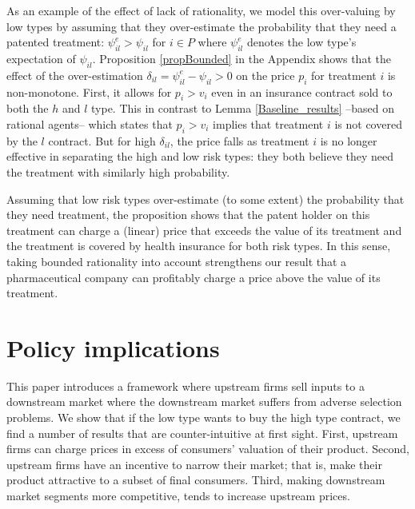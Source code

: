 \documentclass[a4paper,12pt]{article}
\begin{document}
As an example of the effect of lack of rationality, we model this over-valuing by low types by assuming that they over-estimate the probability that they need a patented treatment: \(\psi_{il}^e > \psi_{il}\) for \(i \in P\) where \(\psi_{il}^e\) denotes the low type's expectation of \(\psi_{il}\). Proposition \ref{propBounded} in the Appendix shows that the effect of the over-estimation \(\delta_{il} = \psi_{il}^e-\psi_{il}>0\) on the price \(p_i\) for treatment \(i\) is non-monotone. First, it allows for \(p_i>v_i\) even in an insurance contract sold to both the \(h\) and \(l\) type. This in contrast to Lemma \ref{Baseline_results} --based on rational agents-- which states that \(p_{i}>v_{i}\) implies that treatment \(i\) is not covered by the \(l\) contract. But for high \(\delta_{il}\), the price falls as treatment \(i\) is no longer effective in separating the high and low risk types: they both believe they need the treatment with similarly high probability.

Assuming that low risk types over-estimate (to some extent) the probability that they need treatment, the proposition shows that the patent holder on this treatment can charge a (linear) price that exceeds the value of its treatment and the treatment is covered by health insurance for both risk types. In this sense, taking bounded rationality into account strengthens our result that a pharmaceutical company can profitably charge a price above the value of its treatment.

\section{Policy implications}
\label{sec:org0f2d968}

This paper introduces a framework where upstream firms sell inputs to a downstream market where the downstream market suffers from adverse selection problems. We show that if the low type wants to buy the high type contract, we find a number of results that are counter-intuitive at first sight. First, upstream firms can charge prices in excess of consumers' valuation of their product. Second, upstream firms have an incentive to narrow their market; that is, make their product attractive to a subset of final consumers. Third, making downstream market segments more competitive, tends to increase upstream prices.
\end{document}
